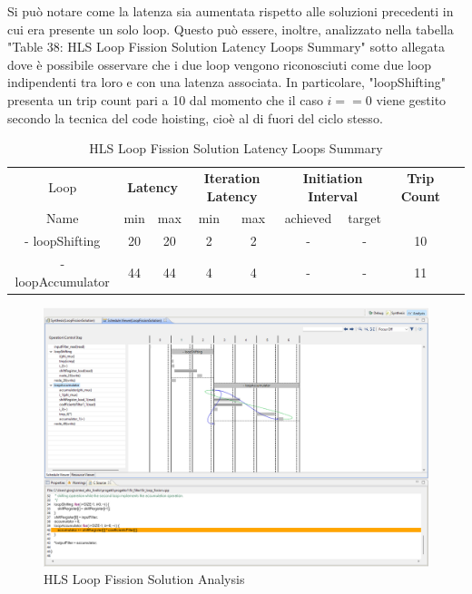 Si può notare come la latenza sia aumentata rispetto alle soluzioni precedenti in cui era presente un solo loop. Questo può essere, inoltre, analizzato nella tabella "Table 38: HLS Loop Fission Solution Latency Loops Summary" sotto allegata dove è possibile osservare che i due loop vengono riconosciuti come due loop indipendenti tra loro e con una latenza associata. In particolare, "loopShifting" presenta un trip count pari a 10 dal momento che il caso $i==0$ viene gestito secondo la tecnica del code hoisting, cioè al di fuori del ciclo stesso.

\begin{table}[H]
    \centering
    \begin{tabular}{|c|c|c|c|c|c|c|c|c|}
        \hline
        \multicolumn{1}{|c|}{Loop} & \multicolumn{2}{|c|}{\textbf{Latency}} & \multicolumn{2}{c|}{\textbf{Iteration Latency}} & \multicolumn{2}{c|}{\textbf{Initiation Interval}} & \multicolumn{1}{c|}{\textbf{Trip Count}}  \\
        Name & min & max & min & max & achieved & target &  \\
        \hline
        - loopShifting & 20 & 20 & 2 & 2 & - & - & 10 \\
        - loopAccumulator & 44 & 44 & 4 & 4 & - & - & 11 \\
        \hline
    \end{tabular}
    \caption{HLS Loop Fission Solution Latency Loops Summary }
    \label{tab:hls-loop-fission-solution-loop-summary}
\end{table}

\begin{figure}[H]
    \centering
    \includegraphics[width=1\textwidth]{solutions/loop_fission/loopfissionanalysis.png}
    \caption{HLS Loop Fission Solution Analysis}
\end{figure}

